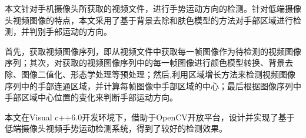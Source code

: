 
{ %

本文针对手机摄像头所获取的视频文件，进行手势运动方向的检测。针对低端摄像头视频图像的特点，本文采用了基于背景去除和肤色模型的方法对手部区域进行检测，并判别手部运动的方向。

首先，获取视频图像序列，即从视频文件中获取每一帧图像作为待检测的视频图像序列；其次，对获取的视频图像序列中的每一帧图像进行颜色模型转换、背景去除、图像二值化、形态学处理等预处理；然后,利用区域增长方法来检测视频图像序列中的手部连通区域，并计算每帧图像中手部区域的中心；最后根据图像序列中手部区域中心位置的变化来判断手部运动方向。

本文在Visual c++6.0开发环境下，借助于OpenCV开放平台，设计并实现了基于低端摄像头视频手势运动检测系统，得到了较好的检测效果。


} 